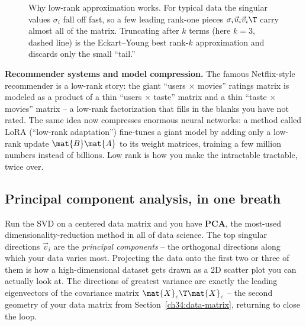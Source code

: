 \begin{figure}[H]
\centering
{}
\caption{Why low-rank approximation works. For typical data the singular values $\sigma_i$
fall off fast, so a few leading rank-one pieces $\sigma_i\vec{u}_i\vec{v}_i\T$ carry almost
all of the matrix. Truncating after $k$ terms (here $k=3$, dashed line) is the Eckart--Young
best rank-$k$ approximation and discards only the small ``tail.''}
\label{ch34:fig-svdecay}
\end{figure}

\begin{applicationbox}
\textbf{Recommender systems and model compression.} The famous Netflix-style
recommender is a low-rank story: the giant ``users $\times$ movies'' ratings matrix is
modeled as a product of a thin ``users $\times$ taste'' matrix and a thin ``taste
$\times$ movies'' matrix -- a low-rank factorization that fills in the blanks you have
not rated. The same idea now compresses enormous neural networks: a method called LoRA
(``low-rank adaptation'') fine-tunes a giant model by adding only a low-rank update
$\mat{B}\mat{A}$ to its weight matrices, training a few million numbers instead of
billions. Low rank is how you make the intractable tractable, twice over.
\end{applicationbox}

\subsection{Principal component analysis, in one breath}

Run the SVD on a centered data matrix and you have \textbf{PCA}, the most-used
dimensionality-reduction method in all of data science. The top singular directions
$\vec{v}_i$ are the \emph{principal components} -- the orthogonal directions along which
your data varies most. Projecting the data onto the first two or three of them is how a
high-dimensional dataset gets drawn as a 2D scatter plot you can actually look at. The
directions of greatest variance are exactly the leading eigenvectors of the covariance
matrix $\mat{X}_c\T\mat{X}_c$ -- the second geometry of your data matrix from
Section~\ref{ch34:data-matrix}, returning to close the loop.


